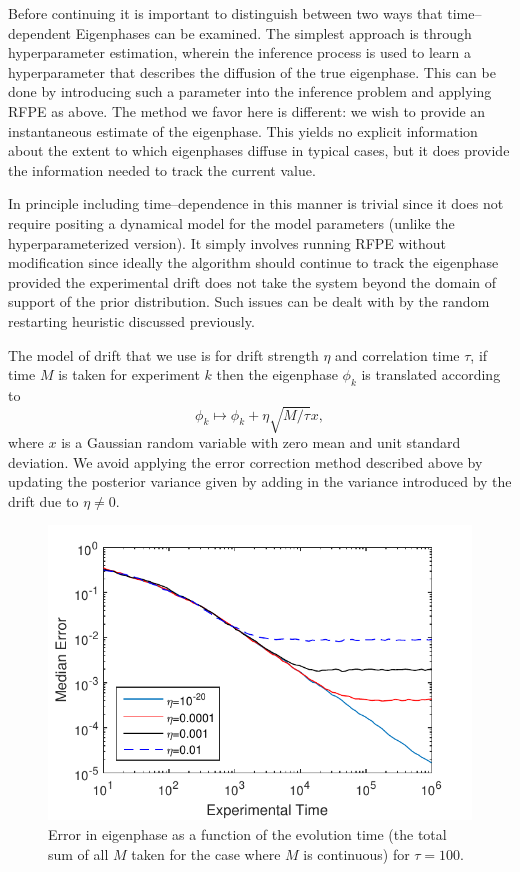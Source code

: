 \documentclass[aps,pra,amsmath,twocolumn,amssymb,superscriptaddress]{revtex4-1}
\begin{document}
{Before continuing it is important to distinguish between two ways that time--dependent Eigenphases can be examined.  The simplest approach is through hyperparameter estimation, wherein the inference process is used to learn a hyperparameter that describes the diffusion of the true eigenphase.  This can be done by introducing such a parameter into the inference problem and applying RFPE as above.  The method we favor here is different: we wish to provide an instantaneous estimate of the eigenphase.  This yields no explicit information about the extent to which eigenphases diffuse in typical cases, but it does provide the information needed to track the current value.

In principle including time--dependence in this manner is trivial since it does not require positing a dynamical model for the model parameters (unlike the hyperparameterized version).
It simply involves running RFPE without modification since ideally the algorithm should continue to track the eigenphase provided the experimental drift does not take the system beyond the 
domain of support of the prior distribution.  Such issues can be dealt with by the random restarting heuristic discussed previously.

The model of drift that we use is for drift strength $\eta$ and correlation time $\tau$, if time $M$ is taken for experiment $k$ then the eigenphase $\phi_k$ is translated according to
\begin{equation}
\phi_k \mapsto \phi_k + \eta\sqrt{M/\tau}x,
\end{equation}
where $x$ is a Gaussian random variable with zero mean and unit standard deviation.  We avoid applying the error correction method described above by updating the posterior variance given by adding in the variance introduced by the drift due to $\eta \ne 0$.

\begin{figure}
\includegraphics[width=0.6\linewidth]{Timedep.pdf}
\caption{Error in eigenphase as a function of the evolution time (the total sum of all $M$ taken for the case where $M$ is continuous) for $\tau=100$.}\label{fig:Timedep}
\end{figure}

}
\end{document}
